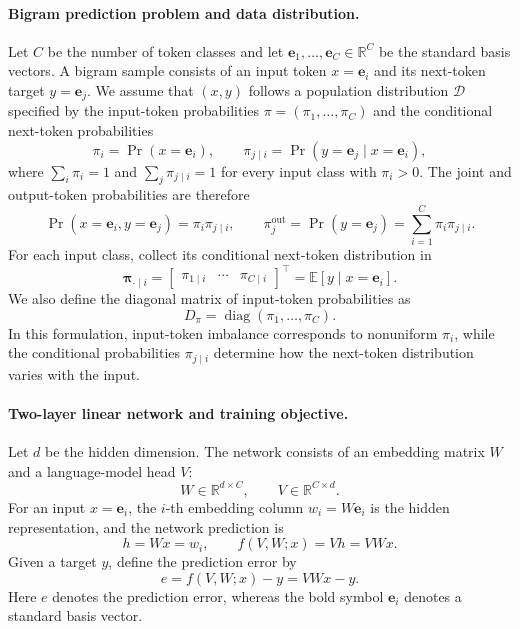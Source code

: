 \documentclass[11pt]{article}
\newcommand{\R}{\mathbb{R}}
\newcommand{\E}{\mathbb{E}}
\newcommand{\diag}{\operatorname{diag}}
\begin{document}
\paragraph{Bigram prediction problem and data distribution.}
Let \(C\) be the number of token classes and let
\(\bm{e}_1,\ldots,\bm{e}_C\in\R^C\) be the standard basis vectors.  A bigram
sample consists of an input token \(x=\bm{e}_i\) and its next-token target
\(y=\bm{e}_j\).  We assume that \((x,y)\) follows a population distribution
\(\mathcal{D}\) specified by the input-token probabilities
\(\pi=(\pi_1,\ldots,\pi_C)\) and the conditional next-token probabilities
\begin{equation*}
\pi_i=\Pr(x=\bm{e}_i),
\qquad
\pi_{j\mid i}=\Pr(y=\bm{e}_j\mid x=\bm{e}_i),
\end{equation*}
where \(\sum_i\pi_i=1\) and \(\sum_j\pi_{j\mid i}=1\) for every input class
with \(\pi_i>0\).  The joint and output-token probabilities are therefore
\begin{equation*}
\Pr(x=\bm{e}_i,y=\bm{e}_j)=\pi_i\pi_{j\mid i},
\qquad
\pi_j^{\mathrm{out}}
=\Pr(y=\bm{e}_j)
=\sum_{i=1}^C\pi_i\pi_{j\mid i}.
\end{equation*}
For each input class, collect its conditional next-token distribution in
\begin{equation*}
\bm{\pi}_{\cdot\mid i}
=
\begin{bmatrix}
\pi_{1\mid i}&\cdots&\pi_{C\mid i}
\end{bmatrix}^{\!\top}
=\E[y\mid x=\bm{e}_i].
\end{equation*}
We also define the diagonal matrix of input-token probabilities as
\begin{equation*}
D_\pi=\diag(\pi_1,\ldots,\pi_C).
\end{equation*}
In this formulation, input-token imbalance corresponds to nonuniform
\(\pi_i\), while the conditional probabilities \(\pi_{j\mid i}\) determine
how the next-token distribution varies with the input.

\paragraph{Two-layer linear network and training objective.}
Let \(d\) be the hidden dimension.  The network consists of an embedding
matrix \(W\) and a language-model head \(V\):
\begin{equation*}
W\in\R^{d\times C},
\qquad
V\in\R^{C\times d}.
\end{equation*}
For an input \(x=\bm{e}_i\), the \(i\)-th embedding column
\(w_i=W\bm{e}_i\) is the hidden representation, and the network prediction is
\begin{equation*}
h=Wx=w_i,
\qquad
f(V,W;x)=Vh=VWx.
\end{equation*}
Given a target \(y\), define the prediction error by
\begin{equation*}
e=f(V,W;x)-y=VWx-y.
\end{equation*}
Here \(e\) denotes the prediction error, whereas the bold symbol
\(\bm{e}_i\) denotes a standard basis vector.
\end{document}
